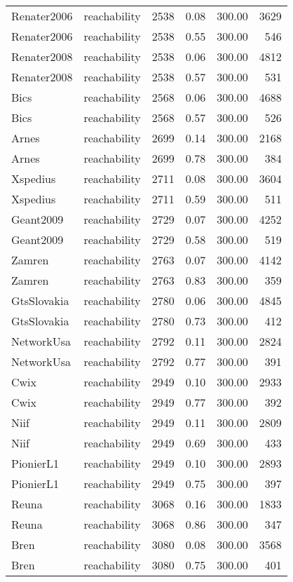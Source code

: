 \begin{tabular}{llrrrr}
Renater2006 & reachability & 2538 & 0.08 & 300.00 & 3629 \\
Renater2006 & reachability & 2538 & 0.55 & 300.00 & 546 \\
Renater2008 & reachability & 2538 & 0.06 & 300.00 & 4812 \\
Renater2008 & reachability & 2538 & 0.57 & 300.00 & 531 \\
Bics & reachability & 2568 & 0.06 & 300.00 & 4688 \\
Bics & reachability & 2568 & 0.57 & 300.00 & 526 \\
Arnes & reachability & 2699 & 0.14 & 300.00 & 2168 \\
Arnes & reachability & 2699 & 0.78 & 300.00 & 384 \\
Xspedius & reachability & 2711 & 0.08 & 300.00 & 3604 \\
Xspedius & reachability & 2711 & 0.59 & 300.00 & 511 \\
Geant2009 & reachability & 2729 & 0.07 & 300.00 & 4252 \\
Geant2009 & reachability & 2729 & 0.58 & 300.00 & 519 \\
Zamren & reachability & 2763 & 0.07 & 300.00 & 4142 \\
Zamren & reachability & 2763 & 0.83 & 300.00 & 359 \\
GtsSlovakia & reachability & 2780 & 0.06 & 300.00 & 4845 \\
GtsSlovakia & reachability & 2780 & 0.73 & 300.00 & 412 \\
NetworkUsa & reachability & 2792 & 0.11 & 300.00 & 2824 \\
NetworkUsa & reachability & 2792 & 0.77 & 300.00 & 391 \\
Cwix & reachability & 2949 & 0.10 & 300.00 & 2933 \\
Cwix & reachability & 2949 & 0.77 & 300.00 & 392 \\
Niif & reachability & 2949 & 0.11 & 300.00 & 2809 \\
Niif & reachability & 2949 & 0.69 & 300.00 & 433 \\
PionierL1 & reachability & 2949 & 0.10 & 300.00 & 2893 \\
PionierL1 & reachability & 2949 & 0.75 & 300.00 & 397 \\
Reuna & reachability & 3068 & 0.16 & 300.00 & 1833 \\
Reuna & reachability & 3068 & 0.86 & 300.00 & 347 \\
Bren & reachability & 3080 & 0.08 & 300.00 & 3568 \\
Bren & reachability & 3080 & 0.75 & 300.00 & 401 \\

\end{tabular}
